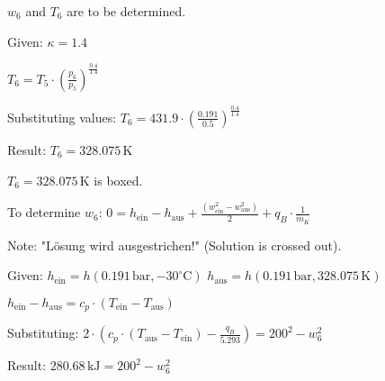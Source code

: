 \( w_6 \) and \( T_6 \) are to be determined.  

Given:  
\( \kappa = 1.4 \)  

\( T_6 = T_5 \cdot \left( \frac{p_6}{p_5} \right)^{\frac{0.4}{1.4}} \)  

Substituting values:  
\( T_6 = 431.9 \cdot \left( \frac{0.191}{0.5} \right)^{\frac{0.4}{1.4}} \)  

Result:  
\( T_6 = 328.075 \, \text{K} \)  

\( T_6 = 328.075 \, \text{K} \) is boxed.  

To determine \( w_6 \):  
\( 0 = h_{\text{ein}} - h_{\text{aus}} + \frac{(w_{\text{ein}}^2 - w_{\text{aus}}^2)}{2} + q_B \cdot \frac{1}{\dot{m}_K} \)  

Note: "Lösung wird ausgestrichen!" (Solution is crossed out).  

Given:  
\( h_{\text{ein}} = h(0.191 \, \text{bar}, -30^\circ \text{C}) \)  
\( h_{\text{aus}} = h(0.191 \, \text{bar}, 328.075 \, \text{K}) \)  

\( h_{\text{ein}} - h_{\text{aus}} = c_p \cdot (T_{\text{ein}} - T_{\text{aus}}) \)  

Substituting:  
\( 2 \cdot \left( c_p \cdot (T_{\text{aus}} - T_{\text{ein}}) - \frac{q_B}{5.293} \right) = 200^2 - w_6^2 \)  

Result:  
\( 280.68 \, \text{kJ} = 200^2 - w_6^2 \)